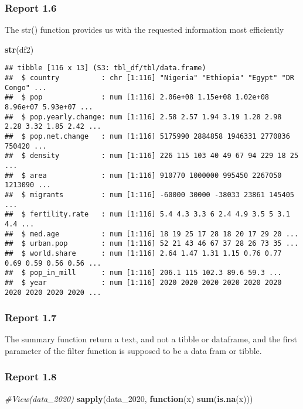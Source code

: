 \documentclass[
]{article}
\newenvironment{Shaded}{\begin{snugshade}}{\end{snugshade}}
\newcommand{\CommentTok}[1]{\textcolor[rgb]{0.56,0.35,0.01}{\textit{#1}}}
\newcommand{\ControlFlowTok}[1]{\textcolor[rgb]{0.13,0.29,0.53}{\textbf{#1}}}
\newcommand{\FunctionTok}[1]{\textcolor[rgb]{0.13,0.29,0.53}{\textbf{#1}}}
\newcommand{\NormalTok}[1]{#1}
\begin{document}
\subsubsection{Report 1.6}\label{report-1.6}

The str() function provides us with the requested information most
efficiently

\begin{Shaded}
\begin{Highlighting}[]
\FunctionTok{str}\NormalTok{(df2)}
\end{Highlighting}
\end{Shaded}

\begin{verbatim}
## tibble [116 x 13] (S3: tbl_df/tbl/data.frame)
##  $ country          : chr [1:116] "Nigeria" "Ethiopia" "Egypt" "DR Congo" ...
##  $ pop              : num [1:116] 2.06e+08 1.15e+08 1.02e+08 8.96e+07 5.93e+07 ...
##  $ pop.yearly.change: num [1:116] 2.58 2.57 1.94 3.19 1.28 2.98 2.28 3.32 1.85 2.42 ...
##  $ pop.net.change   : num [1:116] 5175990 2884858 1946331 2770836 750420 ...
##  $ density          : num [1:116] 226 115 103 40 49 67 94 229 18 25 ...
##  $ area             : num [1:116] 910770 1000000 995450 2267050 1213090 ...
##  $ migrants         : num [1:116] -60000 30000 -38033 23861 145405 ...
##  $ fertility.rate   : num [1:116] 5.4 4.3 3.3 6 2.4 4.9 3.5 5 3.1 4.4 ...
##  $ med.age          : num [1:116] 18 19 25 17 28 18 20 17 29 20 ...
##  $ urban.pop        : num [1:116] 52 21 43 46 67 37 28 26 73 35 ...
##  $ world.share      : num [1:116] 2.64 1.47 1.31 1.15 0.76 0.77 0.69 0.59 0.56 0.56 ...
##  $ pop_in_mill      : num [1:116] 206.1 115 102.3 89.6 59.3 ...
##  $ year             : num [1:116] 2020 2020 2020 2020 2020 2020 2020 2020 2020 2020 ...
\end{verbatim}

\subsubsection{Report 1.7}\label{report-1.7}

The summary function return a text, and not a tibble or dataframe, and
the first parameter of the filter function is supposed to be a data fram
or tibble.

\subsubsection{Report 1.8}\label{report-1.8}

\begin{Shaded}
\begin{Highlighting}[]
\CommentTok{\#View(data\_2020)}
\FunctionTok{sapply}\NormalTok{(data\_2020, }\ControlFlowTok{function}\NormalTok{(x) }\FunctionTok{sum}\NormalTok{(}\FunctionTok{is.na}\NormalTok{(x)))}
\end{Highlighting}
\end{Shaded}
\end{document}
